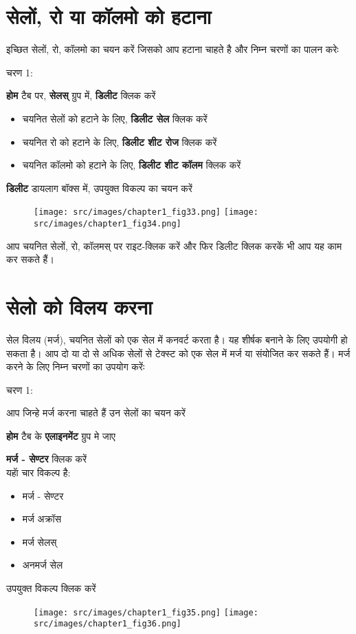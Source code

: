 \section{सेलों, रो या कॉलमो को हटाना}\label{id-1.16}	

इच्छित सेलों, रो, कॉलमो का चयन करें जिसको आप हटाना चाहते है और निम्न चरणों का पालन करेः
\begin{descriptionSimple}{चरण 1:}
\item[चरण 1] \textbf{होम} टैब पर, \textbf{सेलस्} ग्रुप में, \textbf{डिलीट} क्लिक करें
\item[चरण 2]
		\begin{itemize}
		\item चयनित सेलों को हटाने के लिए, \textbf{डिलीट सेल} क्लिक करें
		\item चयनित रो को हटाने के लिए, \textbf{डिलीट शीट रोज} क्लिक करें
		\item चयनित कॉलमो को हटाने के लिए, \textbf{डिलीट शीट कॉलम} क्लिक करें
		\end{itemize}
\item[चरण 3] \textbf{डिलीट} डायलाग बॉक्स में, उपयुक्त विकल्प का चयन करें
\end{descriptionSimple}
\begin{figure}[H]
\centering
\texttt{[image: src/images/chapter1\_fig33.png]}\qquad
\texttt{[image: src/images/chapter1\_fig34.png]}
\end{figure}

आप चयनित सेलों, रो, कॉलमस् पर राइट-क्लिक करें और फिर डिलीट क्लिक करकें भी आप यह काम कर सकते हैं।

	
\section{सेलो को विलय करना}\label{id-1.17}

सेल विलय (मर्ज), चयनित सेलों को एक सेल में कनवर्ट करता है। यह शीर्षक बनाने के लिए उपयोगी हो सकता है। आप दो या दो से अधिक सेलों से टेक्स्ट को एक सेल में मर्ज या संयोजित कर सकते हैं। मर्ज करने के लिए निम्न चरणों का उपयोग करेंः

\begin{descriptionSimple}{चरण 1:}
\item[चरण 1]  आप जिन्हे मर्ज करना चाहते हैं उन सेलों का चयन करें
\item[चरण 2] \textbf{होम} टैब के \textbf{एलाइनमेंट} ग्रुप मे जाए
\item[चरण 3] \textbf{मर्ज - सेण्टर} क्लिक करें\\  यहॅा चार विकल्प है:
		\begin{itemize}
		\item मर्ज - सेण्टर
		\item मर्ज अक्रॉस
		\item मर्ज सेलस्
		\item अनमर्ज सेल
		\end{itemize}
\item[चरण 4]  उपयुक्त विकल्प क्लिक करें
\end{descriptionSimple}				
\begin{figure}[H]
\centering
\texttt{[image: src/images/chapter1\_fig35.png]}\qquad
\texttt{[image: src/images/chapter1\_fig36.png]}
\end{figure}
				
